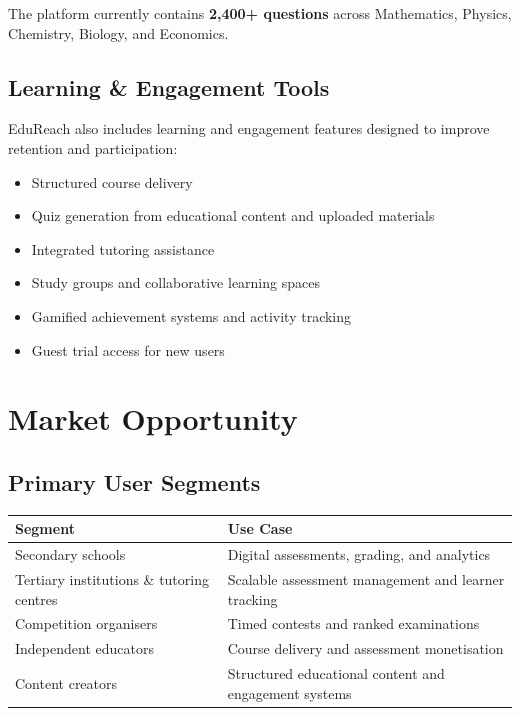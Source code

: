\documentclass[a4paper,11pt]{article}
\begin{document}
The platform currently contains \textbf{2,400+ questions} across Mathematics, Physics, Chemistry, Biology, and Economics.

\subsection{Learning \& Engagement Tools}

EduReach also includes learning and engagement features designed to improve retention and participation:

\begin{itemize}[nosep]
    \item Structured course delivery
    \item Quiz generation from educational content and uploaded materials
    \item Integrated tutoring assistance
    \item Study groups and collaborative learning spaces
    \item Gamified achievement systems and activity tracking
    \item Guest trial access for new users
\end{itemize}

\section{Market Opportunity}

\subsection*{Primary User Segments}

\begin{table}[h]
\centering
\begin{tabular}{@{}p{} p{}@{}}
\toprule
\rowcolor{indigobg}
\textcolor{indigobrand}{\textbf{Segment}} & \textcolor{indigobrand}{\textbf{Use Case}} \\
\midrule
Secondary schools & Digital assessments, grading, and analytics \\
Tertiary institutions \& tutoring centres & Scalable assessment management and learner tracking \\
Competition organisers & Timed contests and ranked examinations \\
Independent educators & Course delivery and assessment monetisation \\
Content creators & Structured educational content and engagement systems \\
\bottomrule
\end{tabular}
\end{table}
\end{document}
